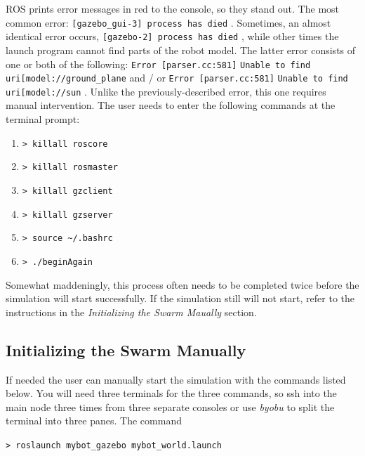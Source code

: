\documentclass[9pt,twocolumn,twoside]{../../styles/osajnl}
\begin{document}
ROS prints error messages in red to the console, so they stand out.  The most common error: {\color{red} \lstinline[style=BashInputStyle]![gazebo_gui-3] process has died! }.  Sometimes, an almost identical error occurs, {\color{red} \lstinline[style=BashInputStyle]![gazebo-2] process has died! }, while other times the launch program cannot find parts of the robot model.  The latter error consists of one or both of the following: {\color{red} \lstinline[style=BashInputStyle]!Error [parser.cc:581]! }{\lstinline[style=BashInputStyle]!Unable to find uri[model://ground_plane! } and / or {\color{red} \lstinline[style=BashInputStyle]!Error [parser.cc:581]! }{\lstinline[style=BashInputStyle]!Unable to find uri[model://sun! }.  Unlike the previously-described error, this one requires manual intervention.  The user needs to enter the following commands at the terminal prompt: 

\begin{enumerate}
\setlength\itemsep{-6pt}
\item {\lstinline[style=BashInputStyle]!> killall roscore! }
\item {\lstinline[style=BashInputStyle]!> killall rosmaster! }
\item {\lstinline[style=BashInputStyle]!> killall gzclient! } 
\item {\lstinline[style=BashInputStyle]!> killall gzserver! }
\item {\lstinline[style=BashInputStyle]!> source ~/.bashrc! } 
\item {\lstinline[style=BashInputStyle]!> ./beginAgain! }
\end{enumerate}

Somewhat maddeningly, this process often needs to be completed twice before the simulation will start successfully.  If the simulation still will not start, refer to the instructions in the \textit{Initializing the Swarm Maually} section.

\subsection{Initializing the Swarm Manually}
If needed the user can manually start the simulation with the commands listed below.  You will need three terminals for the three commands, so ssh into the main node three times from three separate consoles or use \textit{byobu} to split the terminal into three panes.  The command

 {\lstinline[style=BashInputStyle]!> roslaunch mybot_gazebo mybot_world.launch! } 
\end{document}
